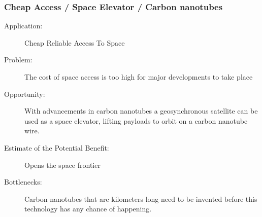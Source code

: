 \subsubsection{Cheap Access / Space Elevator / Carbon nanotubes}
\begin{description}  \item[Application:] Cheap Reliable Access To Space 
 
\item[Problem:] The cost of space  access is too high for major developments to take place 
 
\item[Opportunity:]  With advancements in carbon nanotubes a geosynchronous satellite can be  used as a space elevator, lifting payloads to orbit on a carbon  nanotube wire.
 
\item[Estimate  of the Potential Benefit:] Opens the space frontier
 
\item[Bottlenecks:] Carbon  nanotubes that are kilometers long need to be invented before this  technology has any chance of happening.

\end{description}
 
 
